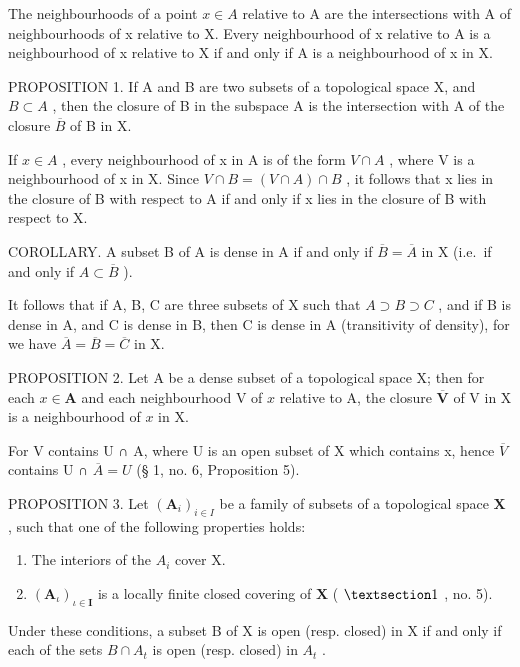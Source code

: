 The neighbourhoods of a point \(x \in A\) relative to A are the intersections with A of neighbourhoods of x relative to X. Every neighbourhood of x relative to A is a neighbourhood of x relative to X if and only if A is a neighbourhood of x in X.

PROPOSITION 1. If A and B are two subsets of a topological space X, and \(B \subset A\) , then the closure of B in the subspace A is the intersection with A of the closure \(\overline{B}\) of B in X.

If \(x \in A\) , every neighbourhood of x in A is of the form \(V \cap A\) , where V is a neighbourhood of x in X. Since \(V \cap B = (V \cap A) \cap B\) , it follows that x lies in the closure of B with respect to A if and only if x lies in the closure of B with respect to X.

COROLLARY. A subset B of A is dense in A if and only if \(\overline{B} = \overline{A}\) in X (i.e.~if and only if \(A \subset \overline{B}\) ).

It follows that if A, B, C are three subsets of X such that \(A \supset B \supset C\) , and if B is dense in A, and C is dense in B, then C is dense in A (transitivity of density), for we have \(\overline{A} = \overline{B} = \overline{C}\) in X.

PROPOSITION 2. Let A be a dense subset of a topological space X; then for each \(x \in \mathbf{A}\) and each neighbourhood V of \(x\) relative to A, the closure \(\overline{\mathbf{V}}\) of V in X is a neighbourhood of \(x\) in X.

For V contains U ∩ A, where U is an open subset of X which contains x, hence \(\overline{V}\) contains U ∩ \(\overline{A} = U\) (§ 1, no. 6, Proposition 5).

PROPOSITION 3. Let \((\mathbf{A}_i)_{i\in I}\) be a family of subsets of a topological space \(\mathbf{X}\) , such that one of the following properties holds:

\begin{enumerate}
\def\labelenumi{\alph{enumi})}
\item
  The interiors of the \(A_{i}\) cover X.
\item
  \((\mathbf{A}_{\iota})_{\iota \in \mathbf{I}}\) is a locally finite closed covering of \(\mathbf{X}\) ( \(\S 1\) , no. 5).
\end{enumerate}

Under these conditions, a subset B of X is open (resp. closed) in X if and only if each of the sets \(B \cap A_{t}\) is open (resp. closed) in \(A_{t}\) .

